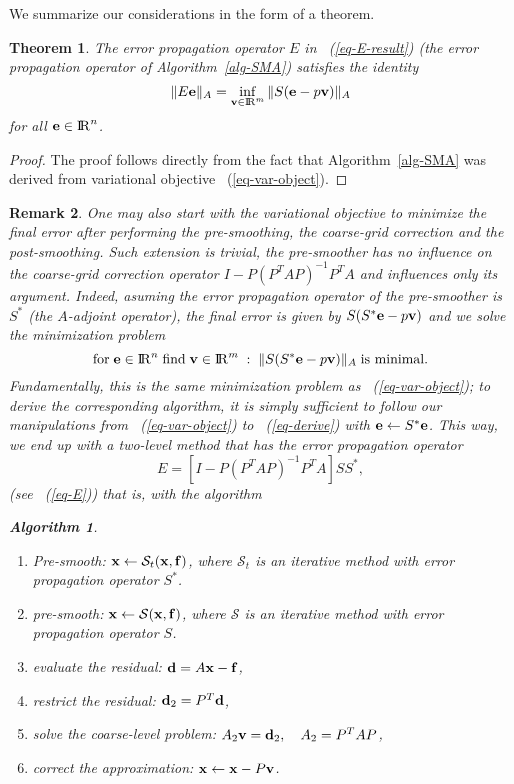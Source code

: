 \documentclass[twoside, 12pt]{article}
\newtheorem{theorem}{Theorem}
\newtheorem{theorem}{Theorem}[section]
\renewcommand{\Re}{{\rm I\negthinspace R}}
\newcommand{\vc}[1]{{\bf #1}} 			%
\newcommand{\eq}[1]{\begin{equation}\label{eq-#1}}
\newcommand{\qe}{\end{equation}}
\newcommand{\eqr}[1]{~(\ref{eq-#1})}        %
\newtheorem{algorithm}{Algorithm}
\newtheorem{notenote}[theorem]{Remark}
\newenvironment{note}{\begin{notenote}\rm}{\end{notenote}}
\begin{document}
We summarize our considerations in the form of a theorem.
\begin{theorem}
The error propagation operator $E$ in \eqr{E-result} (the error
propagation operator of Algorithm~\ref{alg-SMA})
satisfies the identity
$$
      \|E\vc{e}\|_A = \inf_{\vc{v} \in \Re^m} \|S(\vc{e}-p\vc{v})\|_A
$$
for all $\vc{e} \in \Re^n$.
\end{theorem}
\begin{proof}
The proof follows directly from the fact that Algorithm~\ref{alg-SMA}
was derived from variational objective \eqr{var-object}.
\end{proof}

\begin{note}
\label{note-pre}
One may also start with the variational objective to minimize the final error
after performing the pre-smoothing, the coarse-grid correction and the
post-smoothing.
Such extension is trivial, the pre-smoother has no influence on the
coarse-grid correction operator $I - P(P^TAP)^{-1}P^TA$ and influences only
its argument.
Indeed, asuming the error propagation operator of the
pre-smoother is $S^*$ (the $A$-adjoint operator),
the final error is given by $S(S^*\vc{e}-p\vc{v})$
and we solve the minimization problem
\eq{objective1}
\mbox{for}\;\vc{e} \in \Re^n\;
\mbox{find} \; \vc{v} \in \Re^m\;:\; \|S(S^*\vc{e}-p\vc{v})\|_A \;
\mbox{is minimal}.
\qe
Fundamentally, this is the same minimization problem as \eqr{var-object};
to derive the corresponding algorithm, it is simply sufficient to follow
our manipulations from \eqr{var-object} to \eqr{derive}
with $\vc{e} \leftarrow S^*\vc{e}$. This way,
we end up with a two-level method that has the error propagation
operator
\eq{epp1}
   E=\left[I - P(P^TAP)^{-1}P^TA \right] SS^*,
\qe
(see \eqr{E}) that is, with the algorithm
\begin{algorithm}
\label{alg-SMA1-pre}
\quad
\begin{enumerate}
\item Pre-smooth: $\vc{x} \leftarrow {\mathcal S_t}(\vc{x},\vc{f})$,
where ${\mathcal S_t}$ is an iterative method with error propagation
operator $S^*$.
\item pre-smooth: $\vc{x} \leftarrow {\mathcal S}(\vc{x},\vc{f})$,
where ${\mathcal S}$ is an iterative method with error propagation
operator $S$.
\item evaluate the residual: $\vc{d}=A\vc{x}-\vc{f}$,
\item restrict the residual: $\vc{d}_2 = P^T\vc{d}$,
\item solve the coarse-level problem:
      $A_2 \vc{v} = \vc{d}_2,\quad A_2 = P^TAP$,
\item correct the approximation:
      $\vc{x}\leftarrow \vc{x} - P\vc{v}$.
\end{enumerate}
\end{algorithm}
\end{note}
\end{document}
